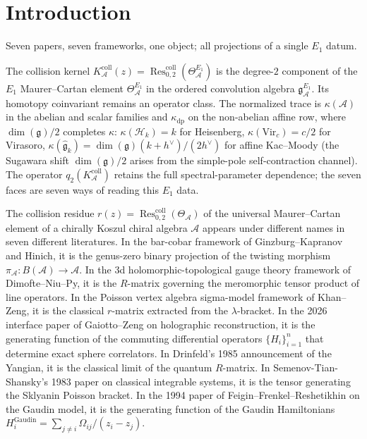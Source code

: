 \documentclass[11pt]{article}
\theoremstyle{plain}
\theoremstyle{definition}
\theoremstyle{remark}
\newcommand{\fg}{\mathfrak{g}}
\newcommand{\cA}{\mathcal{A}}
\newcommand{\cH}{\mathcal{H}}
\newcommand{\Res}{\operatorname{Res}}
\newcommand{\Vir}{\mathrm{Vir}}
\begin{document}

\section{Introduction}\label{sec:intro}

Seven papers, seven frameworks, one object; all projections of a
single $E_1$ datum.

The collision kernel
$K_\cA^{\mathrm{coll}}(z)
=\Res^{\mathrm{coll}}_{0,2}(\Theta_{\cA}^{E_1})$ is the
degree-$2$ component of the $E_1$ Maurer--Cartan element
$\Theta^{E_1}_{\cA}$ in the ordered convolution algebra
$\mathfrak{g}^{E_1}_\cA$. Its homotopy coinvariant remains an
operator class. The normalized trace is $\kappa(\cA)$ in the abelian
and scalar families and $\kappa_{\mathrm{dp}}$ on the non-abelian
affine row, where $\dim(\fg)/2$ completes $\kappa$:
$\kappa(\cH_k)=k$ for Heisenberg, $\kappa(\Vir_c)=c/2$ for
Virasoro, $\kappa(\widehat{\fg}_k)=\dim(\fg)(k+h^\vee)/(2h^\vee)$
for affine Kac--Moody (the Sugawara shift $\dim(\fg)/2$ arises from
the simple-pole self-contraction channel). The operator
$q_2(K_\cA^{\mathrm{coll}})$ retains the full spectral-parameter
dependence; the seven faces are seven ways of reading this
$E_1$ data.

The collision residue
$r(z) = \Res^{\mathrm{coll}}_{0,2}(\Theta_{\cA})$ of the universal
Maurer--Cartan element of a chirally Koszul chiral algebra $\cA$
appears under different names in seven different literatures. In
the bar-cobar framework of Ginzburg--Kapranov and Hinich, it is the
genus-zero binary projection of the twisting morphism
$\pi_{\cA}\colon B(\cA)\to\cA$. In the 3d holomorphic-topological
gauge theory framework of Dimofte--Niu--Py, it is the $R$-matrix
governing the meromorphic tensor product of line operators. In
the Poisson vertex algebra sigma-model framework of Khan--Zeng,
it is the classical $r$-matrix extracted from the $\lambda$-bracket.
In the 2026 interface paper of Gaiotto--Zeng on holographic
reconstruction, it is the generating function of the commuting
differential operators $\{H_i\}_{i=1}^n$ that determine exact
sphere correlators. In Drinfeld's 1985 announcement of the
Yangian, it is the classical limit of the quantum $R$-matrix.
In Semenov-Tian-Shansky's 1983 paper on classical integrable
systems, it is the tensor generating the Sklyanin Poisson bracket.
In the 1994 paper of Feigin--Frenkel--Reshetikhin on the Gaudin
model, it is the generating function of the Gaudin Hamiltonians
$H_i^{\mathrm{Gaudin}} = \sum_{j\neq i}\Omega_{ij}/(z_i-z_j)$.
\end{document}
